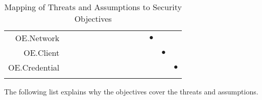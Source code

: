 \documentclass[12pt,english]{scrbook}
\newcommand{\oh}{$\bullet$}
\begin{document}
\begin{longtable}{r|R|R|R|R|R|R|R|R|R|R|R|R|R|}
OE.Network   &       &       &            &            &               &             &             &        &      &         &  \oh    &            &                   \\   
OE.Client    &       &       &            &            &               &             &             &        &      &         &         &    \oh     &                   \\
OE.Credential&       &       &            &            &               &             &             &        &      &         &         &            &    \oh    \\ 
\bottomrule
  \caption{Mapping of Threats and Assumptions to Security Objectives}
  \label{tab-SOR}
\end{longtable}

The following list explains why the objectives cover
the threats and assumptions.
\end{document}
